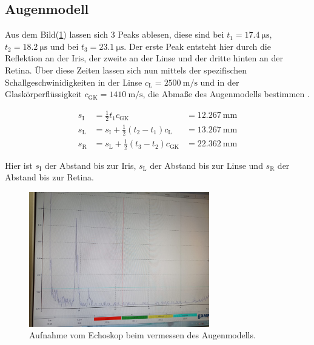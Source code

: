     \subsection{Augenmodell}

        \noindent Aus dem Bild(\ref{img:Auge_dat}) lassen sich 3 Peaks ablesen, diese sind bei $t_1 = \SI{17.4}{\micro \second}$, 
        $t_2 = \SI{18.2}{\micro \second}$ und bei $t_3 = \SI{23.1}{\micro \second}$. Der erste Peak entsteht hier durch die Reflektion an der Iris, 
        der zweite an der Linse und der dritte hinten an der Retina. Über diese Zeiten lassen sich nun mittels der spezifischen 
        Schallgeschwinidigkeiten in der Linse $c_{\text{L}} = \SI{2500}{\meter\per\second}$ und in der Glaskörperflüssigkeit 
        $c_{\text{GK}} = \SI{1410}{\meter\per\second}$, die Abmaße des Augenmodells bestimmen \cite{US1}. 

        \begin{align*}
             s_{\text{I}} & = \frac{1}{2} t_1 c_{\text{GK}}                      &= \SI{12.267}{\milli\metre}   \\
             s_{\text{L}} & = s_{\text{I}} + \frac{1}{2} (t_2-t_1) c_{\text{L}}  &= \SI{13.267}{\milli\metre}  \\
             s_{\text{R}} & = s_{\text{L}} + \frac{1}{2} (t_3-t_2) c_{\text{GK}} &= \SI{22.362}{\milli\metre} 
        \end{align*}

        \noindent Hier ist $s_{\text{I}}$ der Abstand bis zur Iris, $s_{\text{L}}$ der Abstand bis zur Linse und $s_{\text{R}}$ der Abstand 
        bis zur Retina.

        \begin{figure}[h]
            \centering
            \includegraphics[width=0.7\textwidth]{latex/images/Auge_dat.jpeg}
            \caption{Aufnahme vom Echoskop beim vermessen des Augenmodells.}
            \label{img:Auge_dat}
        \end{figure}